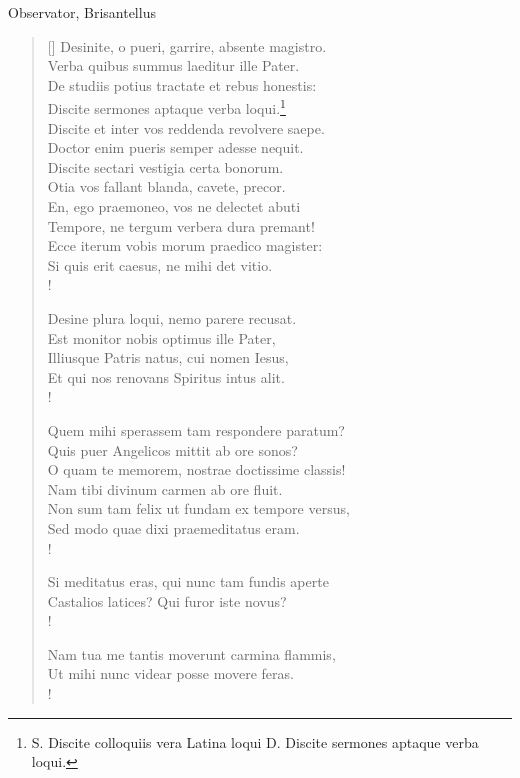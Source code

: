 \documentclass{article}
\begin{document}
Observator, Brisantellus

\settowidth{\versewidth}{Desinite, o pueri, garrire, absente magistro.}
\begin{verse}[\versewidth]
 Desinite, o pueri, garrire, absente magistro.\\
Verba quibus summus laeditur ille Pater.\\
De studiis potius tractate et rebus honestis:\\
Discite sermones aptaque verba loqui.\footnote{S. Discite colloquiis vera Latina loqui D. Discite sermones aptaque verba loqui.}\\
Discite et inter vos reddenda revolvere saepe.\\
Doctor enim pueris semper adesse nequit.\\
Discite sectari vestigia certa bonorum. \\
Otia vos fallant blanda, cavete, precor. \\
En, ego praemoneo, vos ne delectet abuti \\
Tempore, ne tergum verbera dura premant!\\ 
Ecce iterum vobis morum praedico magister: \\
Si quis erit caesus, ne mihi det vitio.\\!

 Desine plura loqui, nemo parere recusat. \\
Est monitor nobis optimus ille Pater, \\
Illiusque Patris natus, cui nomen Iesus, \\
Et qui nos renovans Spiritus intus alit.\\!

 Quem mihi sperassem tam respondere paratum?\\
Quis puer Angelicos mittit ab ore sonos?\\
O quam te memorem, nostrae doctissime classis! \\
Nam tibi divinum carmen ab ore fluit. \\
Non sum tam felix ut fundam ex tempore versus, \\
Sed modo quae dixi praemeditatus eram.\\!

 Si meditatus eras, qui nunc tam fundis aperte \\
Castalios latices? Qui furor iste novus?\\!

 Nam tua me tantis moverunt carmina flammis, \\
Ut mihi nunc videar posse movere feras.\\!


\end{verse}
\end{document}

